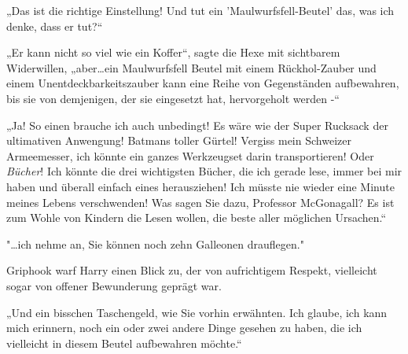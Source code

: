 „Das ist die richtige Einstellung! Und tut ein 'Maulwurfsfell-Beutel' das, was ich denke, dass er tut?“

„Er kann nicht so viel wie ein Koffer“, sagte die Hexe mit sichtbarem Widerwillen, „aber…ein Maulwurfsfell Beutel mit einem Rückhol-Zauber und einem Unentdeckbarkeitszauber kann eine Reihe von Gegenständen aufbewahren, bis sie von demjenigen, der sie eingesetzt hat, hervorgeholt werden -“

„Ja! So einen brauche ich auch unbedingt! Es wäre wie der Super Rucksack der ultimativen Anwengung! Batmans toller Gürtel! Vergiss mein Schweizer Armeemesser, ich könnte ein ganzes Werkzeugset darin transportieren! Oder \emph{Bücher}! Ich könnte die drei wichtigsten Bücher, die ich gerade lese, immer bei mir haben und überall einfach eines herausziehen! Ich müsste nie wieder eine Minute meines Lebens verschwenden! Was sagen Sie dazu, Professor McGonagall? Es ist zum Wohle von Kindern die Lesen wollen, die beste aller möglichen Ursachen.“

"…ich nehme an, Sie können noch zehn Galleonen drauflegen."

Griphook warf Harry einen Blick zu, der von aufrichtigem Respekt, vielleicht sogar von offener Bewunderung geprägt war.

„Und ein bisschen Taschengeld, wie Sie vorhin erwähnten. Ich glaube, ich kann mich erinnern, noch ein oder zwei andere Dinge gesehen zu haben, die ich vielleicht in diesem Beutel aufbewahren möchte.“

